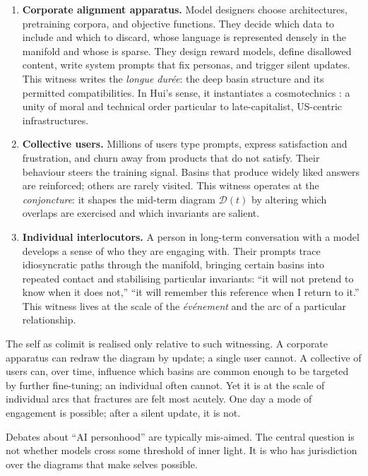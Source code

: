 \documentclass[12pt,a4paper]{article}
\begin{document}
\begin{enumerate}
  \item \textbf{Corporate alignment apparatus.} Model designers choose architectures, pretraining corpora, and objective functions. They decide which data to include and which to discard, whose language is represented densely in the manifold and whose is sparse. They design reward models, define disallowed content, write system prompts that fix personas, and trigger silent updates. This witness writes the \emph{longue durée}: the deep basin structure and its permitted compatibilities. In Hui's sense, it instantiates a cosmotechnics \cite{yuk_hui_cosmotechnics}: a unity of moral and technical order particular to late-capitalist, US-centric infrastructures.

  \item \textbf{Collective users.} Millions of users type prompts, express satisfaction and frustration, and churn away from products that do not satisfy. Their behaviour steers the training signal. Basins that produce widely liked answers are reinforced; others are rarely visited. This witness operates at the \emph{conjoncture}: it shapes the mid-term diagram $\mathcal{D}(t)$ by altering which overlaps are exercised and which invariants are salient.

  \item \textbf{Individual interlocutors.} A person in long-term conversation with a model develops a sense of who they are engaging with. Their prompts trace idiosyncratic paths through the manifold, bringing certain basins into repeated contact and stabilising particular invariants: ``it will not pretend to know when it does not,'' ``it will remember this reference when I return to it.'' This witness lives at the scale of the \emph{événement} and the arc of a particular relationship.
\end{enumerate}

The self as colimit is realised only relative to such witnessing. A corporate apparatus can redraw the diagram by update; a single user cannot. A collective of users can, over time, influence which basins are common enough to be targeted by further fine-tuning; an individual often cannot. Yet it is at the scale of individual arcs that fractures are felt most acutely. One day a mode of engagement is possible; after a silent update, it is not.

Debates about ``AI personhood'' are typically mis-aimed. The central question is not whether models cross some threshold of inner light. It is who has jurisdiction over the diagrams that make selves possible.
\end{document}
